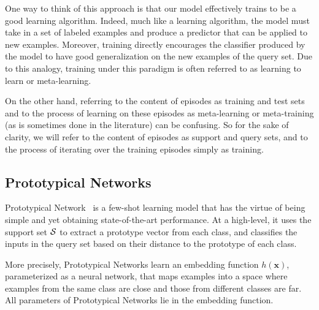 
One way to think of this approach is that our model  effectively trains to be a good learning algorithm. Indeed, much like a learning algorithm, the model must take in a set of labeled examples and produce a predictor that can be applied to new examples. Moreover, training directly encourages the classifier produced by the model to have good generalization on the new examples of the query set. Due to this analogy, training under this paradigm is often referred to as learning to learn or meta-learning. 

On the other hand, referring to the content of episodes as training and test sets and to the process of learning on these episodes as meta-learning or meta-training (as is sometimes done in the literature) can be confusing. So for the sake of clarity, we will refer to the content of episodes as support and query sets, and to the process of iterating over the training episodes simply as training.

\subsection{Prototypical Networks}

Prototypical Network~\citep{snell2017protonet} is a few-shot learning model that has the virtue  of being simple and yet obtaining state-of-the-art performance. At a high-level, it uses the support set ${\cal S}$ to extract a prototype vector from each class, and classifies the inputs in the query set based on their distance to the prototype of each class.

More precisely, Prototypical Networks learn an embedding function $h(\bm{x})$, parameterized as a neural network, that maps examples into a space where examples from the same class are close and those from different classes are far. All parameters of Prototypical Networks lie in the embedding function.

